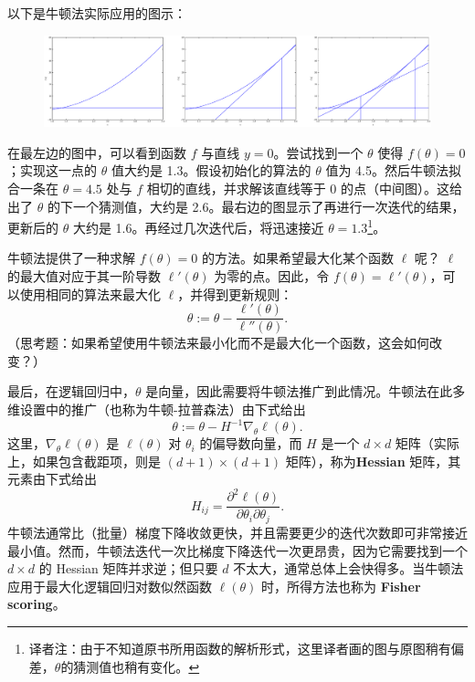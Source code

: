 以下是牛顿法实际应用的图示：

\begin{figure}[H]
  \centering
  \includegraphics[width=0.93\linewidth]{figs/newton_iteration.pdf}
\end{figure}

\setcounter{footnote}{0}
\renewcommand{\thefootnote}{\fnsymbol{footnote}}
在最左边的图中，可以看到函数 $f$ 与直线 $y=0$。尝试找到一个 $\theta$ 使得 $f(\theta)=0$；实现这一点的 $\theta$ 值大约是 1.3。假设初始化的算法的 $\theta$ 值为 4.5。然后牛顿法拟合一条在 $\theta=4.5$ 处与 $f$ 相切的直线，并求解该直线等于 0 的点（中间图）。这给出了 $\theta$ 的下一个猜测值，大约是 2.6。最右边的图显示了再进行一次迭代的结果，更新后的 $\theta$ 大约是 1.6。再经过几次迭代后，将迅速接近 $\theta = 1.3$\footnote{译者注：由于不知道原书所用函数的解析形式，这里译者画的图与原图稍有偏差，$\theta$的猜测值也稍有变化。}。
\setcounter{footnote}{1}
\renewcommand{\thefootnote}{\arabic{footnote}}

牛顿法提供了一种求解 $f(\theta)=0$ 的方法。如果希望最大化某个函数 $\ell$ 呢？ $\ell$ 的最大值对应于其一阶导数 $\ell'(\theta)$ 为零的点。因此，令 $f(\theta) = \ell'(\theta)$，可以使用相同的算法来最大化 $\ell$，并得到更新规则：
\[
    \theta := \theta - \frac{\ell'(\theta)}{\ell''(\theta)}.
\]
（思考题：如果希望使用牛顿法来最小化而不是最大化一个函数，这会如何改变？）

最后，在逻辑回归中，$\theta$ 是向量，因此需要将牛顿法推广到此情况。牛顿法在此多维设置中的推广（也称为牛顿-拉普森法）由下式给出
\[
    \theta := \theta - H^{-1} \nabla_\theta \ell(\theta).
\]
这里，$\nabla_\theta \ell(\theta)$ 是 $\ell(\theta)$ 对 $\theta_i$ 的偏导数向量，而 $H$ 是一个 $d \times d$ 矩阵（实际上，如果包含截距项，则是 $(d+1) \times (d+1)$ 矩阵），称为\textbf{Hessian} 矩阵，其元素由下式给出
\[
    H_{ij} = \frac{\partial^2 \ell(\theta)}{\partial \theta_i \partial \theta_j}.
\]
牛顿法通常比（批量）梯度下降收敛更快，并且需要更少的迭代次数即可非常接近最小值。然而，牛顿法迭代一次比梯度下降迭代一次更昂贵，因为它需要找到一个 $d \times d$ 的 Hessian 矩阵并求逆；但只要 $d$ 不太大，通常总体上会快得多。当牛顿法应用于最大化逻辑回归对数似然函数 $\ell(\theta)$ 时，所得方法也称为 \textbf{Fisher scoring}。